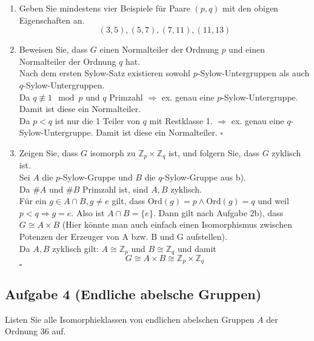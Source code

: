 \documentclass[11pt,a4paper,ngerman]{article}
\newcommand{\Z}{\mathbb{Z}}
\newcommand{\ord}{\text{Ord}}
\begin{document}
\begin{enumerate}[\bfseries a)]
\item Geben Sie mindestens vier Beispiele für Paare $(p,q)$ mit den obigen Eigenschaften an. \\

$$ (3, 5), (5, 7), (7, 11), (11, 13) $$

\item Beweisen Sie, dass $G$ einen Normalteiler der Ordnung $p$ und einen Normalteiler der Ordnung $q$ hat. \\

Nach dem ersten Sylow-Satz existieren sowohl $p$-Sylow-Untergruppen als auch $q$-Sylow-Untergruppen.\\
Da $q \not\equiv 1 \mod p$ und $q$ Primzahl $\Rightarrow$ ex. genau eine $p$-Sylow-Untergruppe. Damit ist diese ein Normalteiler. \\
Da $p < q$ ist nur die 1 Teiler von $q$ mit Restklasse 1. $\Rightarrow$ ex. genau eine $q$-Sylow-Untergruppe. Damit ist diese ein Normalteiler.
\mbox{} \hfill $\square$

\item  Zeigen Sie, dass $G$ isomorph zu $\Z_p \times \Z_q$ ist, und folgern Sie, dass $G$ zyklisch ist. \\

Sei $A$ die $p$-Sylow-Gruppe und $B$ die $q$-Sylow-Gruppe aus b).\\
Da $\#A$ und $\#B$ Primzahl ist, sind $A, B$ zyklisch. \\
Für ein $g \in A \cap B, g \neq e$ gilt, dass $\ord(g) = p \land \ord(g) = q$ und weil $p < q \Rightarrow g = e$. Also ist $ A \cap B = \{ e \}$. Dann gilt nach Aufgabe 2b), dass $G \cong A \times B$ (Hier könnte man auch einfach einen Isomorphismus zwischen Potenzen der Erzeuger von A bzw. B und G aufstellen).\\
Da $A,B$ zyklisch gilt: $A \cong \Z_p$ und $B \cong \Z_q$ und damit 
$$
G \cong A \times B \cong \Z_p \times \Z_q
$$
\mbox{} \hfill $\square$
\end{enumerate}


\subsection*{Aufgabe 4 \mdseries (Endliche abelsche Gruppen)}
Listen Sie alle Isomorphieklassen von endlichen abelschen Gruppen $A$ der Ordnung 36
auf. \\
\end{document}

